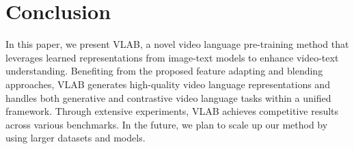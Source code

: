 \documentclass{article}
\begin{document}
\section{Conclusion}

In this paper, we present VLAB, a novel video language pre-training method that leverages learned representations from image-text models to enhance video-text understanding. Benefiting from the proposed feature adapting and blending approaches, VLAB generates high-quality video language representations and handles both generative and contrastive video language tasks within a unified framework. Through extensive experiments, VLAB achieves competitive results across various benchmarks. In the future, we plan to scale up our method by using larger datasets and models.



\small

\end{document}
